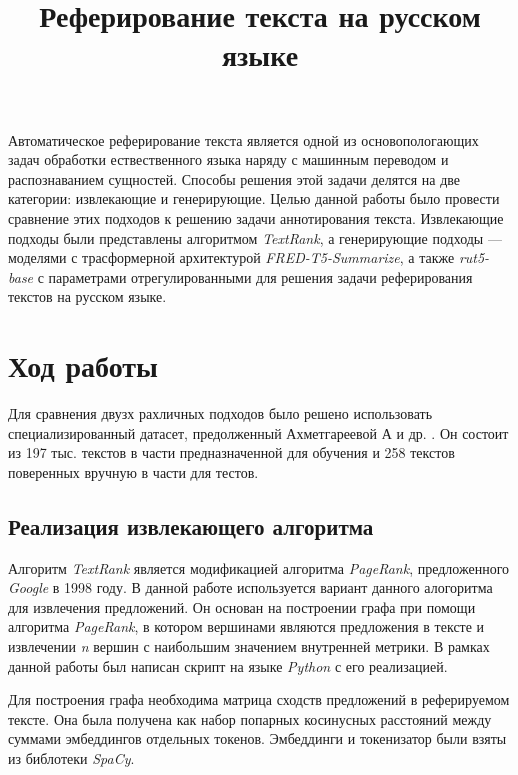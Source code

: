\documentclass[12pt, a4paper]{article}
\title{Реферирование текста на русском языке}
\begin{document}
	\maketitle

	\tableofcontents
	
	\begin{introduction}
        Автоматическое реферирование текста является одной из основопологающих задач обработки ествественного языка наряду с машинным переводом и распознаванием сущностей. Способы решения этой задачи делятся на две категории: извлекающие и генерирующие. Целью данной работы было провести сравнение этих подходов к решению задачи аннотирования текста. Извлекающие подходы были представлены алгоритмом \textit{TextRank}, а генерирующие подходы --- моделями с трасформерной архитектурой \textit{FRED-T5-Summarize}, а также \textit{rut5-base} с параметрами отрегулированными для решения задачи реферирования текстов на русском языке.  
	\end{introduction}
	
	\section{Ход работы}

    Для сравнения двузх рахличных подходов было решено использовать специализированный датасет, предолженный Ахметгареевой А и др. \cite{dataset}. Он состоит из 197 тыс. текстов в части предназначенной для обучения и 258 текстов поверенных вручную в части для тестов. 

    \subsection{Реализация извлекающего алгоритма}
    Алгоритм \textit{TextRank} является модификацией алгоритма \textit{PageRank}, предложенного \textit{Google} в 1998 году. В данной работе используется вариант данного алогоритма для извлечения предложений. Он основан на построении графа при помощи алгоритма \textit{PageRank}, в котором вершинами являются предложения в тексте и извлечении \textit{n} вершин с наибольшим значением внутренней метрики. В рамках данной работы был написан скрипт на языке \textit{Python} с его реализацией. 

    Для построения графа необходима матрица сходств предложений в реферируемом тексте. Она была получена как набор попарных косинусных расстояний между суммами эмбеддингов отдельных токенов. Эмбеддинги и токенизатор были взяты из библотеки \textit{SpaCy}.
\end{document}
